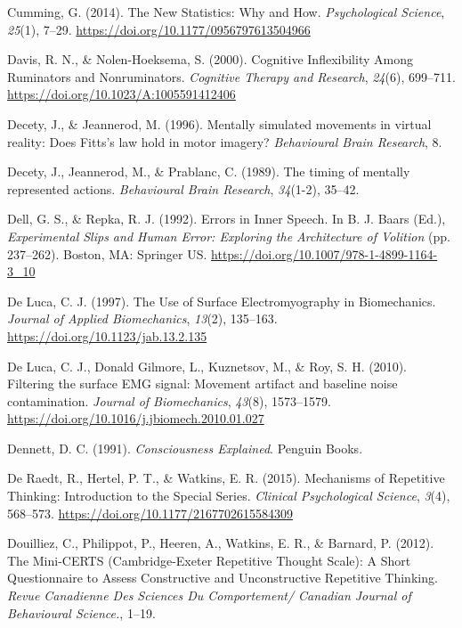 \documentclass[a4paper,12pt,twoside,openright,oldfontcommands]{memoir}
\begin{document}
\leavevmode\hypertarget{ref-cumming_new_2014}{}%
Cumming, G. (2014). The New Statistics: Why and How. \emph{Psychological Science}, \emph{25}(1), 7--29. \url{https://doi.org/10.1177/0956797613504966}

\leavevmode\hypertarget{ref-Davis2000}{}%
Davis, R. N., \& Nolen-Hoeksema, S. (2000). Cognitive Inflexibility Among Ruminators and Nonruminators. \emph{Cognitive Therapy and Research}, \emph{24}(6), 699--711. \url{https://doi.org/10.1023/A:1005591412406}

\leavevmode\hypertarget{ref-decety_mentally_1996}{}%
Decety, J., \& Jeannerod, M. (1996). Mentally simulated movements in virtual reality: Does Fitts's law hold in motor imagery? \emph{Behavioural Brain Research}, 8.

\leavevmode\hypertarget{ref-decety_timing_1989}{}%
Decety, J., Jeannerod, M., \& Prablanc, C. (1989). The timing of mentally represented actions. \emph{Behavioural Brain Research}, \emph{34}(1-2), 35--42.

\leavevmode\hypertarget{ref-dell_errors_1992}{}%
Dell, G. S., \& Repka, R. J. (1992). Errors in Inner Speech. In B. J. Baars (Ed.), \emph{Experimental Slips and Human Error: Exploring the Architecture of Volition} (pp. 237--262). Boston, MA: Springer US. \url{https://doi.org/10.1007/978-1-4899-1164-3_10}

\leavevmode\hypertarget{ref-de_luca_use_1997}{}%
De Luca, C. J. (1997). The Use of Surface Electromyography in Biomechanics. \emph{Journal of Applied Biomechanics}, \emph{13}(2), 135--163. \url{https://doi.org/10.1123/jab.13.2.135}

\leavevmode\hypertarget{ref-de_luca_filtering_2010}{}%
De Luca, C. J., Donald Gilmore, L., Kuznetsov, M., \& Roy, S. H. (2010). Filtering the surface EMG signal: Movement artifact and baseline noise contamination. \emph{Journal of Biomechanics}, \emph{43}(8), 1573--1579. \url{https://doi.org/10.1016/j.jbiomech.2010.01.027}

\leavevmode\hypertarget{ref-dennett_consciousness_1991}{}%
Dennett, D. C. (1991). \emph{Consciousness Explained}. Penguin Books.

\leavevmode\hypertarget{ref-de_raedt_mechanisms_2015}{}%
De Raedt, R., Hertel, P. T., \& Watkins, E. R. (2015). Mechanisms of Repetitive Thinking: Introduction to the Special Series. \emph{Clinical Psychological Science}, \emph{3}(4), 568--573. \url{https://doi.org/10.1177/2167702615584309}

\leavevmode\hypertarget{ref-Douilliez2012}{}%
Douilliez, C., Philippot, P., Heeren, A., Watkins, E. R., \& Barnard, P. (2012). The Mini-CERTS (Cambridge-Exeter Repetitive Thought Scale): A Short Questionnaire to Assess Constructive and Unconstructive Repetitive Thinking. \emph{Revue Canadienne Des Sciences Du Comportement/ Canadian Journal of Behavioural Science.}, 1--19.
\end{document}
